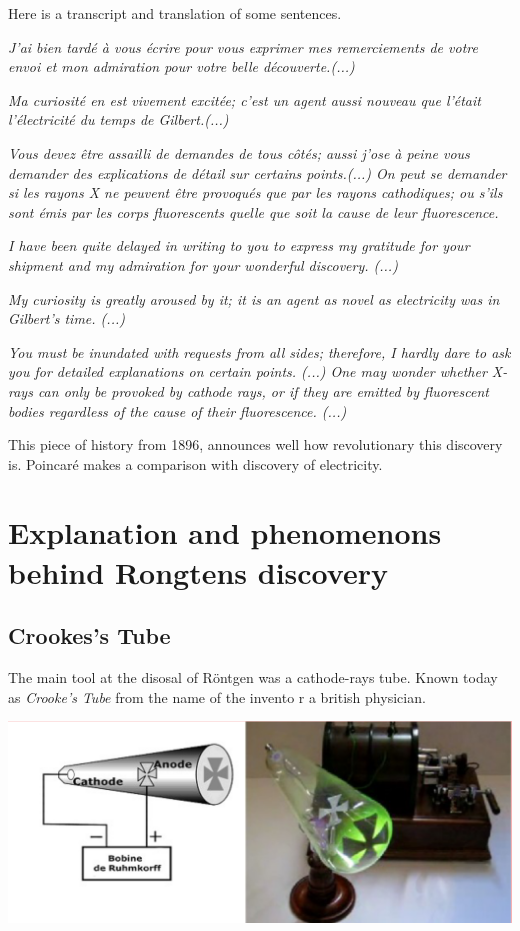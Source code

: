 \documentclass[a4paper,12pt]{report}
\begin{document}
\newpage
Here is a transcript and translation of some sentences.
\begin{multicols}{2}

  \textit{
  J'ai bien tardé à vous écrire pour vous exprimer mes remerciements de votre envoi et mon admiration pour votre belle découverte.(...) }
  
  \textit{Ma curiosité en est vivement excitée; c'est un agent aussi nouveau que l'était l'électricité du temps de Gilbert.(...)}
  
  \textit{Vous devez être assailli de demandes de tous côtés; aussi j'ose à peine vous demander des explications de détail sur certains points.(...)
  On peut se demander si les rayons X ne peuvent être provoqués que par les rayons cathodiques; ou s'ils sont émis par les corps fluorescents quelle que soit la cause de leur fluorescence.}
  

  \columnbreak 
  \textit{
  I have been quite delayed in writing to you to express my gratitude for your shipment and my admiration for your wonderful discovery. (...)}
  
\textit{
  My curiosity is greatly aroused by it; it is an agent as novel as electricity was in Gilbert's time. (...)}
  
\textit{
  You must be inundated with requests from all sides; therefore, I hardly dare to ask you for detailed explanations on certain points. (...)
  One may wonder whether X-rays can only be provoked by cathode rays, or if they are emitted by fluorescent bodies regardless of the cause of their fluorescence. (...)}

\end{multicols}

This piece of history from 1896, announces well how revolutionary this discovery is. Poincaré makes a comparison with discovery of electricity.



\section{Explanation and phenomenons behind Rongtens discovery}
\subsection{Crookes's Tube}
The main tool at the disosal of Röntgen was a cathode-rays tube. Known today as \textit{ Crooke's Tube} from the name of the invento
r a british physician.

\begin{center}
  \includegraphics[scale = 0.7]{tubeCrookes.png}
  \label{tubeCrookes}
\end{center}
\end{document}
